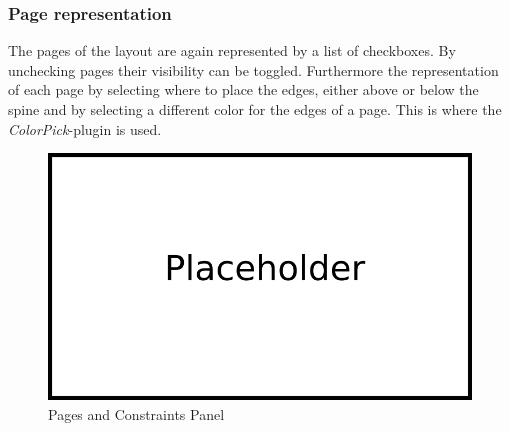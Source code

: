 \subsubsection{Page representation}
The pages of the layout are again represented by a list of checkboxes. By unchecking pages their visibility can be toggled. Furthermore the representation of each page by selecting where to place the edges, either above or below the spine and by selecting a different color for the edges of a page. This is where the \textit{ColorPick}-plugin is used.
\begin{figure}[!h]
\begin{center}
\includegraphics[width=1\textwidth]{figures/Platzhalter.png}
\caption{Pages and Constraints Panel}
\label{img:plzhltr}
\end{center}
\end{figure}

\clearpage
